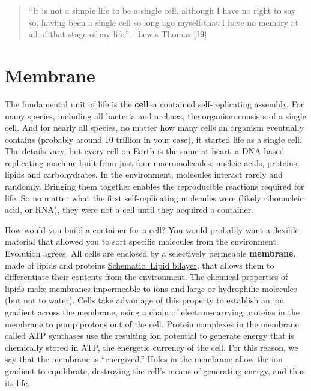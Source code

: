 \documentclass[]{tufte-book}
\begin{document}
\begin{quote}
``It is not a simple life to be a single cell, although I have no right to say so, having been a single cell so long ago myself that I have no memory at all of that stage of my life.''
- Lewis Thomas {[}\protect\hyperlink{ref-thomas1990}{19}{]}
\end{quote}

\hypertarget{membrane}{%
\section{Membrane}\label{membrane}}

The fundamental unit of life is the \textbf{cell}--a contained self-replicating assembly. For many species, including all bacteria and archaea, the organism consists of a single cell. And for nearly all species, no matter how many cells an organism eventually contains (probably around 10 trillion in your case), it started life as a single cell. The details vary, but every cell on Earth is the same at heart--a DNA-based replicating machine built from just four macromolecules: nucleic acids, proteins, lipids and carbohydrates. In the environment, molecules interact rarely and randomly. Bringing them together enables the reproducible reactions required for life. So no matter what the first self-replicating molecules were (likely ribonucleic acid, or RNA), they were not a cell until they acquired a container.

How would you build a container for a cell? You would probably want a flexible material that allowed you to sort specific molecules from the environment. Evolution agrees. All cells are enclosed by a selectively permeable \textbf{membrane}, made of lipids and proteins \protect\hyperlink{Lipid_bilayer}{Schematic: Lipid bilayer}, that allows them to differentiate their contents from the environment. The chemical properties of lipids make membranes impermeable to ions and large or hydrophilic molecules (but not to water). Cells take advantage of this property to establish an ion gradient across the membrane, using a chain of electron-carrying proteins in the membrane to pump protons out of the cell. Protein complexes in the membrane called ATP synthases use the resulting ion potential to generate energy that is chemically stored in ATP, the energetic currency of the cell. For this reason, we say that the membrane is ``energized.'' Holes in the membrane allow the ion gradient to equilibrate, destroying the cell's means of generating energy, and thus its life.
\end{document}
